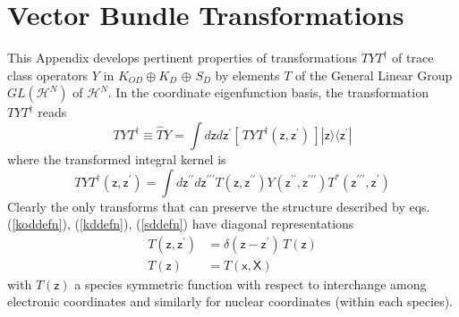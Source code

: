 \documentclass[aps,preprint]{revtex4}%
\begin{document}
\section{Vector Bundle Transformations}

\noindent This Appendix develops pertinent properties of transformations
$TYT^{\dagger}$ of trace class operators $Y$ in $K_{OD}\oplus K_{D}$ $\oplus$
$S_{D}$ by elements $T$ of the General Linear Group $GL\left(  \mathcal{H}%
^{N}\right)  $ of $\mathcal{H}^{N}$. In the coordinate eigenfunction basis,
the transformation $TYT^{\dagger}$ reads
\begin{equation}
TYT^{\dagger}\equiv\hat{T}Y=\int d\mathsf{z}d\mathsf{z}^{\prime}\left[
\,TYT^{\dagger}(\mathsf{z},\mathsf{z}^{\prime})\,\right]  |\mathsf{z}%
\rangle\langle\mathsf{z}^{\prime}| \label{TYT}%
\end{equation}
where the transformed integral kernel is
\begin{equation}
TYT^{\dagger}(\mathsf{z},\mathsf{z}^{\prime})=\int d\mathsf{z}^{\prime\prime
}d\mathsf{z}^{\prime\prime\prime}T(\mathsf{z},\mathsf{z}^{\prime\prime
})Y(\mathsf{z}^{\prime\prime},\mathsf{z}^{\prime\prime\prime})T^{\ast
}(\mathsf{z}^{\prime\prime\prime},\mathsf{z}^{\prime}) \label{TYTkernel}%
\end{equation}
Clearly the only transforms that can preserve the structure described by eqs.
(\ref{koddefn}), (\ref{kddefn}), (\ref{sddefn}) have diagonal representations
\begin{align}
T(\mathsf{z},\mathsf{z}^{\prime})  &  =\delta(\mathsf{z}-\mathsf{z}^{\prime
})\,T(\mathsf{z})\nonumber\\
T(\mathsf{z})  &  =T(\mathsf{x},\mathsf{X}) \label{Tddefn}%
\end{align}
with $T(\mathsf{z})$ a species symmetric function with respect to interchange
among electronic coordinates and similarly for nuclear coordinates (within
each species).
\end{document}
